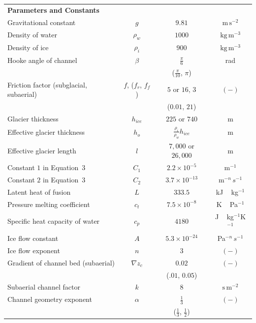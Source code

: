 \documentclass[esurf, manuscript]{copernicus}
\begin{document}
\begin{table}[hbt!]
\begin{tabular}{ l  c  c c }
    \textbf{Parameters and Constants}  & & &\\
    Gravitational constant&$g$& $9.81$&$\mathrm{m\,s^{-2}}$\\
    Density of water & $\rho_w$& $1000$ & $\mathrm{kg\,m^{-3}}$ \\
    Density of ice & $\rho_i$& $900$ & $\mathrm{kg\,m^{-3}}$ \\
    Hooke angle of channel & $\beta$ & $\frac{\pi}{6}$ & \unit{rad}\\
         && ($\frac{\pi}{10}$, $\pi$) & \\
    Friction factor (subglacial, subaerial) & $f$, ($f_r$, $f_f$) &$5$ or $16$, $3$ & $\mathrm{(-)}$ \\
         && ($0.01$, $21$) & \\
    Glacier thickness &$h_{ice}$& $225$ or $740$  &\unit{m}\\
    Effective glacier thickness &$h_o$&$\frac{\rho_i}{\rho_w} h_{ice}$  &\unit{m}\\
    Effective glacier length &$l$& $7,000$ or $26,000$&\unit{m}\\
    Constant $1$ in Equation~3 &$C_1$&$2.2\times10^{-5}$&\unit{m}$^{-1}$\\
    Constant $2$ in Equation~3 &$C_2$&$3.7\times10^{-13}$&\unit{m}$^{-n}\,s^{-1}$\\
    Latent heat of fusion &$L$&$333.5 $&\unit{kJ\,kg}$^{-1}$\\
    Pressure melting coefficient &$c_t$&$7.5\times 10^{-8}$&\unit{K\,Pa}$^{-1}$\\
    Specific heat capacity of water &$c_p$&$4180$&\unit{J\,kg}$^{-1}$\unit{K}$^{-1}$\\
    Ice flow constant &$A$& $5.3\times10^{-24}$ &\unit{Pa}$^{-n}$\,$s^{-1}$\\
    Ice flow exponent &$n$& $3$ &$\mathrm{(-)}$\\
    
    Gradient of channel bed (subaerial) &$\nabla z_c$ &$0.02$& $\mathrm{(-)}$\\
         &&($.01$, $0.05$) & \\
    Subaerial channel factor & $k$ &$8$ & $\mathrm{s\,m^{-2}}$\\
    Channel geometry exponent &$\alpha$&$\frac{1}{3}$ &$\mathrm{(-)}$ \\
         &&($\frac{1}{3}$, $\frac{1}{2}$) & \\
    \hline
  \end{tabular}
  \label{table:vpm}
\end{table}
\end{document}

